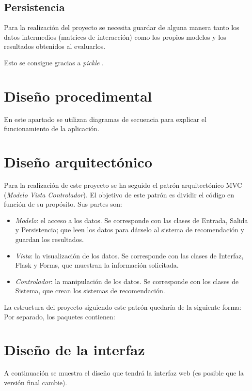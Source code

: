 \subsection{Persistencia}\label{persistencia}
Para la realización del proyecto se necesita guardar de alguna manera tanto los datos intermedios (matrices de interacción) como los propios modelos y los resultados obtenidos al evaluarlos.

Esto se consigue gracias a \textit{pickle} \cite{pickle}.

\section{Diseño procedimental}
En este apartado se utilizan diagramas de secuencia para explicar el funcionamiento de la aplicación.




\section{Diseño arquitectónico}
Para la realización de este proyecto se ha seguido el patrón arquitectónico MVC (\textit{Modelo Vista Controlador}). El objetivo de este patrón es dividir el código en función de su propósito. Sus partes son:
\begin{itemize}
\tightlist
\item \textit{Modelo}: el acceso a los datos. Se corresponde con las clases de Entrada, Salida y Persistencia; que leen los datos para dárselo al sistema de recomendación y guardan los resultados.
\item \textit{Vista}: la visualización de los datos. Se corresponde con las clases de Interfaz, Flask y Forms, que muestran la información solicitada.
\item \textit{Controlador}: la manipulación de los datos. Se corresponde con los clases de Sistema, que crean los sistemas de recomendación.
\end{itemize}

La estructura del proyecto siguiendo este patrón quedaría de la siguiente forma:
Por separado, los paquetes contienen:

\section{Diseño de la interfaz}\label{diseño-gui}
A continuación se muestra el diseño que tendrá la interfaz web (es posible que la versión final cambie).

\begin{landscape}
\end{landscape} 
